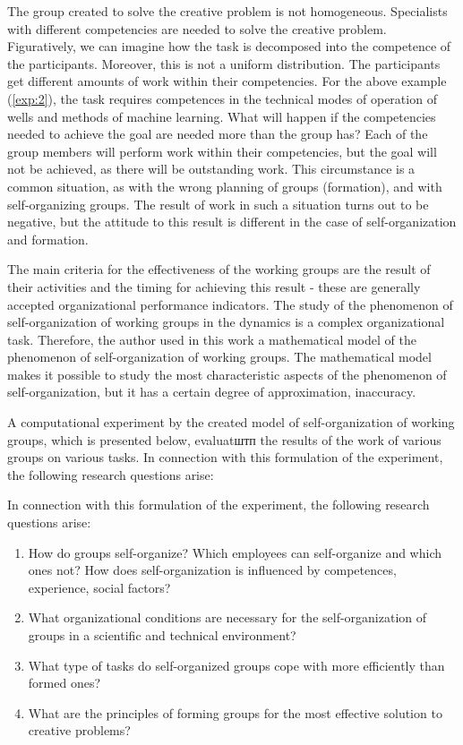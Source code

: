 \documentclass[12pt]{report}
\theoremstyle{definition}
\begin{document}
The group created to solve the creative problem is not homogeneous.
Specialists with different competencies are needed to solve the creative problem.
Figuratively, we can imagine how the task is decomposed into the competence of the participants.
Moreover, this is not a uniform distribution. 
The participants get different amounts of work within their competencies.
For the above example (\ref{exp:2}), the task requires competences in the technical modes of operation of wells and methods of machine learning.
What will happen if the competencies needed to achieve the goal are needed more than the group has?
Each of the group members will perform work within their competencies, but the goal will not be achieved, as there will be outstanding work.
This circumstance is a common situation, as with the wrong planning of groups (formation), and with self-organizing groups.
The result of work in such a situation turns out to be negative, but the attitude to this result is different in the case of self-organization and formation.

The main criteria for the effectiveness of the working groups are the result of their activities and the timing for achieving this result - these are generally accepted organizational performance indicators.
The study of the phenomenon of self-organization of working groups in the dynamics is a complex organizational task.
Therefore, the author used in this work a mathematical model of the phenomenon of self-organization of working groups.
The mathematical model makes it possible to study the most characteristic aspects of the phenomenon of self-organization, but it has a certain degree of approximation, inaccuracy.

A computational experiment by the created model of self-organization of working groups, which is presented below, evaluatштп the results of the work of various groups on various tasks.
In connection with this formulation of the experiment, the following research questions arise: 

In connection with this formulation of the experiment, the following research questions arise:

\begin{enumerate}
\item 
How do groups self-organize? 
Which employees can self-organize and which ones not? 
How does self-organization is influenced by competences, experience, social factors?
\item 
What organizational conditions are necessary for the self-organization of groups in a scientific and technical environment? 
\item 
What type of tasks do self-organized groups cope with more efficiently than formed ones?
\item 
What are the principles of forming groups for the most effective solution to creative problems?
\end{enumerate}
\end{document}
